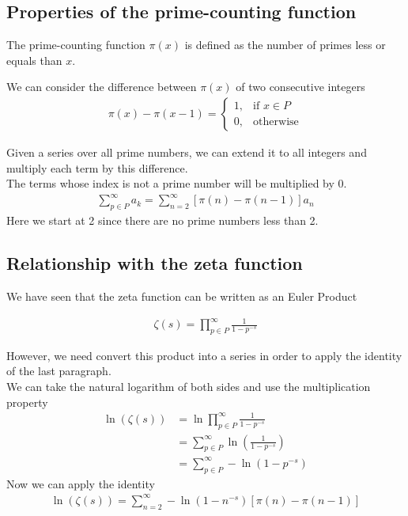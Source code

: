 \documentclass{article}
\begin{document}
\subsection{Properties of the prime-counting function}

The prime-counting function \(\pi(x)\) is defined as the number of primes less or equals than \(x\).

We can consider the difference between \(\pi(x)\) of two consecutive integers
\begin{align*}
    \pi (x)-\pi (x-1)= 
    \begin{cases}
        1,& \text{if } x\in P
        \\
        0,& \text{otherwise}
    \end{cases}
\end{align*}

Given a series over all prime numbers, we can extend it to all integers and multiply each term by this difference.
\\
The terms whose index is not a prime number will be multiplied by 0.
\begin{align*}
    \sum_{p\in P}^{\infty}a_k=\sum_{n=2}^{\infty}\left[\pi(n)-\pi(n-1)\right]a_n
\end{align*}
Here we start at 2 since there are no prime numbers less than 2.

\subsection{Relationship with the zeta function}

We have seen that the zeta function can be written as an Euler Product

\begin{align*}
    \zeta (s)=\prod_{p\in P}^{\infty}\frac{1}{1-p^{-s}}
\end{align*}

However, we need convert this product into a series in order to apply the identity of the last paragraph.
\\
We can take the natural logarithm of both sides and use the multiplication property
\begin{align*}
    \ln\left(\zeta (s)\right)&=\ln\prod_{p\in P}^{\infty}\frac{1}{1-p^{-s}}
    \\
    &=\sum_{p\in P}^{\infty}\ln\left(\frac{1}{1-p^{-s}}\right)
    \\
    &=\sum_{p\in P}^{\infty}-\ln\left(1-p^{-s}\right)
\end{align*}
Now we can apply the identity
\begin{align*}
    \ln\left(\zeta (s)\right)=\sum_{n=2}^{\infty}-\ln\left(1-n^{-s}\right)\left[\pi (n) - \pi (n-1)\right]
\end{align*}
\end{document}
